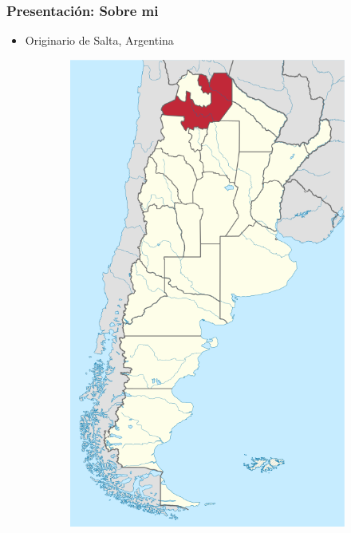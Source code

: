 \documentclass[
  shownotes,
  xcolor={svgnames},
  hyperref={colorlinks,citecolor=DarkBlue,linkcolor=DarkRed,urlcolor=DarkBlue}
  ]{beamer}
\begin{document}
\begin{frame}

\frametitle{Presentación: Sobre mi}
\begin{itemize}
    \item Originario de Salta, Argentina
  \end{itemize}



\begin{figure}[H] \centering
  \captionsetup{justification=centering}

  \centering
  \begin{subfigure}{0.45\linewidth}
    \centering
    \includegraphics[scale=0.2]{figures/salta_map}

\end{subfigure}
\end{figure}
\end{frame}
\end{document}
